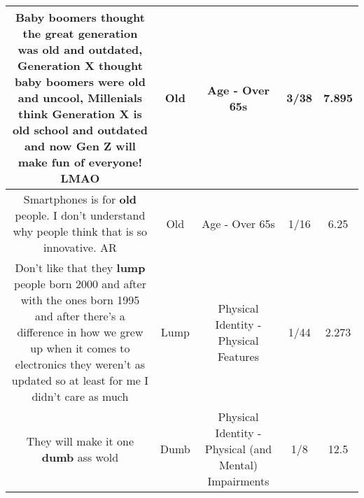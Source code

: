 \documentclass[11pt]{article}
\newlength\mylength
\begin{document}
\begin{center}
\begin{longtable}{|C{.65\mylength}|C{.30\mylength}|C{.12\mylength}|C{.12\mylength}|C{.12\mylength}|}
  \small Baby boomers thought the great generation was \textbf{old} and outdated, Generation X thought baby boomers were \textbf{old} and uncool, Millenials think Generation X is \textbf{old} school and outdated and now Gen Z will make fun of everyone! LMAO\normalsize   & Old & Age - Over 65s & 3/38 & 7.895 \\  \hline
  \small Smartphones is for \textbf{old} people. I don't understand why people think that is so innovative. AR\normalsize   & Old & Age - Over 65s & 1/16 & 6.25 \\  \hline
  \small Don't like that they \textbf{lump} people born 2000 and after with the ones born 1995 and after there's a difference in how we grew up when it comes to electronics they weren't as updated so at least for me I didn't care as much\normalsize   & Lump & Physical Identity - Physical Features & 1/44 & 2.273 \\  \hline
  \small They will make it one \textbf{dumb} ass wold\normalsize   & Dumb & Physical Identity - Physical (and Mental) Impairments & 1/8 & 12.5 \\  \hline

\end{longtable}
\end{center}
\end{document}

